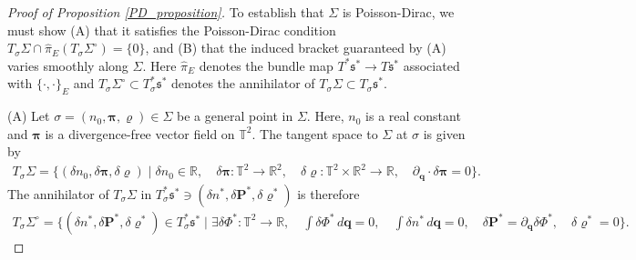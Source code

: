 \documentclass[%
 aip,
 amsmath,amssymb,
reprint, onecolumn %
]{revtex4-1}
\begin{document}
\begin{proof}[Proof of Proposition \ref{PD_proposition}]
To establish that $\Sigma$ is Poisson-Dirac, we must show (A) that it satisfies the Poisson-Dirac condition $T_\sigma \Sigma \cap \widehat{\pi}_E(T_\sigma\Sigma^\circ) = \{0\}$, and (B) that the induced bracket guaranteed by (A) varies smoothly along $\Sigma$. Here $\widehat{\pi}_E$ denotes the bundle map $T^*\mathfrak{s}^*\rightarrow T\mathfrak{s}^*$ associated with $\{\cdot,\cdot\}_E$ and $T_\sigma\Sigma^\circ\subset T^*_\sigma\mathfrak{s}^*$ denotes the annihilator of $T_\sigma\Sigma\subset T_\sigma\mathfrak{s}^*$. 

(A) Let $\sigma = (n_0,\bm{\pi},\varrho)\in\Sigma$ be a general point in $\Sigma$. Here, $n_0$ is a real constant and $\bm{\pi}$ is a divergence-free vector field on $\mathbb{T}^2$. The tangent space to $\Sigma$ at $\sigma$ is given by 
\begin{align*}
T_\sigma\Sigma = \{(\delta n_0,\delta\bm{\pi},\delta\varrho)\mid \delta n_0\in \mathbb{R},\quad \delta\bm{\pi}:\mathbb{T}^2\rightarrow\mathbb{R}^2,\quad \delta\varrho:\mathbb{T}^2\times \mathbb{R}^2\rightarrow\mathbb{R}, \quad \partial_{\bm{q}}\cdot\delta\bm{\pi} = 0\}.
\end{align*}
The annihilator of $T_\sigma\Sigma$ in $T^*_\sigma\mathfrak{s}^*\ni (\delta n^*,\delta\bm{P}^*,\delta\varrho^*)$ is therefore
\begin{align*}
T_\sigma\Sigma^\circ = \{(\delta n^*,\delta\bm{P}^*,\delta\varrho^*)\in T^*_\sigma\mathfrak{s}^*\mid \exists\delta\Phi^*:\mathbb{T}^2\rightarrow\mathbb{R},\quad\int\delta\Phi^*\,d\bm{q} = 0,\quad \int \delta n^*\,d\bm{q} = 0,\quad \delta\bm{P}^* =\partial_{\bm{q}}\delta\Phi^*,\quad \delta\varrho^* = 0\}.
\end{align*}

\end{proof}
\end{document}
